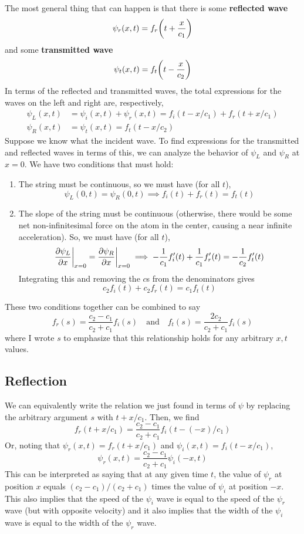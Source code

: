 The most general thing that can happen is that there is some \textbf{reflected wave}
\[ \psi_r(x,t) = f_r\pqty{t + \frac{x}{c_1}}\]
and some \textbf{transmitted wave}
\[ \psi_t(x,t) = f_t\pqty{t - \frac{x}{c_2}}\]
In terms of the reflected and transmitted waves, the total expressions for the waves on the left and right are, respectively,
\begin{align*}
   \psi_L(x,t) &= \psi_i(x,t) + \psi_r(x,t) = f_i(t - x/c_1) + f_r(t + x/c_1) \\
   \psi_R(x,t) &= \psi_t(x,t) = f_t(t - x/c_2)
\end{align*}
Suppose we know what the incident wave. To find expressions for the transmitted and reflected waves in terms of this, we can analyze the behavior of $\psi_L$ and $\psi_R$ at $x=0$. We have two conditions that must hold:
\begin{enumerate}
    \item The string must be continuous, so we must have (for all $t$),
    \[ \psi_L(0, t) = \psi_R(0, t) \implies f_i(t) + f_r(t) = f_t(t)\]
    \item The slope of the string must be continuous (otherwise, there would be some net non-infinitesimal force on the atom in the center, causing a near infinite acceleration). So, we must have (for all $t$),
    \[ \pdv{\psi_L}{x}\biggr|_{x=0} = \pdv{\psi_R}{x}\biggr|_{x=0} \implies -\frac{1}{c_1} f_i'(t) + \frac{1}{c_1} f_r'(t) = -\frac{1}{c_2} f_t'(t) \]
    Integrating this and removing the $c$s from the denominators gives
    \[ c_2f_i(t) + c_2f_r(t) = c_1f_t(t)\]
\end{enumerate}
These two conditions together can be combined to say
\[ f_r(s) = \frac{c_2-c_1}{c_2+c_1}f_i(s) \quad\text{and}\quad f_t(s) = \frac{2c_2}{c_2+c_1}f_i(s)\]
where I wrote $s$ to emphasize that this relationship holds for any arbitrary $x,t$ values.
\subsection*{Reflection}
We can equivalently write the relation we just found in terms of $\psi$ by replacing the arbitrary argument $s$ with $t + x/c_1$. Then, we find
\[ f_r(t + x/c_1) = \frac{c_2-c_1}{c_2+c_1} f_i(t - (-x)/c_1)\]
Or, noting that $\psi_r(x,t) = f_r(t + x/c_1)$ and $\psi_i(x,t) = f_i(t - x/c_1)$,
\[ \psi_r(x,t) = \frac{c_2-c_1}{c_2+c_1} \psi_i(-x,t) \]
This can be interpreted as saying that at any given time $t$, the value of $\psi_r$ at position $x$ equals $(c_2-c_1)/(c_2+c_1)$ times the value of $\psi_i$ at position $-x$. This also implies that the speed of the $\psi_i$ wave is equal to the speed of the $\psi_r$ wave (but with opposite velocity) and it also implies that the width of the $\psi_i$ wave is equal to the width of the $\psi_r$ wave.


